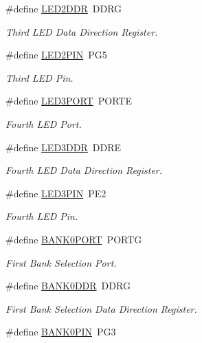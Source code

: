 \begin{DoxyCompactItemize}
\#define \hyperlink{group__config_ga7e635626ee31b094da0a668476132577}{L\-E\-D2\-D\-D\-R}~D\-D\-R\-G
\begin{DoxyCompactList}\small\item\em Third L\-E\-D Data Direction Register. \end{DoxyCompactList}\item 
\#define \hyperlink{group__config_ga50070e632cb68d11f627c5ab60f88683}{L\-E\-D2\-P\-I\-N}~P\-G5
\begin{DoxyCompactList}\small\item\em Third L\-E\-D Pin. \end{DoxyCompactList}\item 
\#define \hyperlink{group__config_ga63df95c1a0ce0e770964ca35e4032fb6}{L\-E\-D3\-P\-O\-R\-T}~P\-O\-R\-T\-E
\begin{DoxyCompactList}\small\item\em Fourth L\-E\-D Port. \end{DoxyCompactList}\item 
\#define \hyperlink{group__config_ga09535652dd0ca340b20840c848cb6093}{L\-E\-D3\-D\-D\-R}~D\-D\-R\-E
\begin{DoxyCompactList}\small\item\em Fourth L\-E\-D Data Direction Register. \end{DoxyCompactList}\item 
\#define \hyperlink{group__config_ga2663b8fc01c4753562adc572cf12a5ed}{L\-E\-D3\-P\-I\-N}~P\-E2
\begin{DoxyCompactList}\small\item\em Fourth L\-E\-D Pin. \end{DoxyCompactList}\item 
\#define \hyperlink{group__config_gabeec1986c81588dde8863b7936028fc9}{B\-A\-N\-K0\-P\-O\-R\-T}~P\-O\-R\-T\-G
\begin{DoxyCompactList}\small\item\em First Bank Selection Port. \end{DoxyCompactList}\item 
\#define \hyperlink{group__config_gafba0bbf9336cfc754622a5e9b3d12d80}{B\-A\-N\-K0\-D\-D\-R}~D\-D\-R\-G
\begin{DoxyCompactList}\small\item\em First Bank Selection Data Direction Register. \end{DoxyCompactList}\item 
\#define \hyperlink{group__config_gaa176e9b2752f764cd7e7d9fd49d46af8}{B\-A\-N\-K0\-P\-I\-N}~P\-G3

\end{DoxyCompactItemize}
